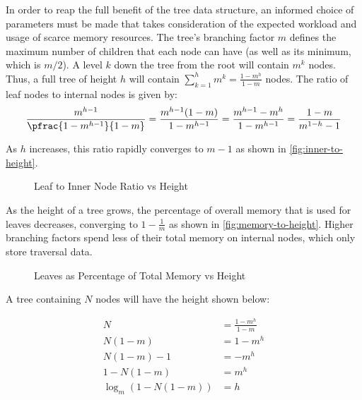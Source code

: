 \label{subsec:system-architecture}

\label{subsec:tree-parameters}


In order to reap the full benefit of the tree data structure, an informed choice
of parameters must be made that takes consideration of the expected workload and
usage of scarce memory resources.
%
The tree's branching factor $m$ defines the maximum number of children that each
node can have (as well as its minimum, which is $m/2$). A level $k$ down the
tree from the root will contain $m^k$ nodes. Thus, a full tree of height $h$
will contain $\sum_{k=1}^h m^k = \frac{1-m^h}{1-m}$ nodes.
%
The ratio of leaf nodes to internal nodes is given by:
$$
	\frac{m^{h-1}}{\pfrac{1-m^{h-1}}{1-m}}
	= \frac{m^{h-1}(1-m)}{1-m^{h-1}}
	= \frac{m^{h-1}-m^{h}}{1-m^{h-1}}
	= \frac{1-m}{m^{1-h} - 1}
$$

As $h$ increases, this ratio rapidly converges to $m-1$ as shown in
\autoref{fig:inner-to-height}.

\begin{figure}[H]
	\centering
	
	\caption{Leaf to Inner Node Ratio vs Height}
	\label{fig:inner-to-height}
\end{figure}

As the height of a tree grows, the percentage of overall memory that is used for
leaves decreases, converging to $1-\frac{1}{m}$ as shown in
\autoref{fig:memory-to-height}. Higher branching factors spend less of their
total memory on internal nodes, which only store traversal data.

\begin{figure}[H]
	\centering
	
	\caption{Leaves as Percentage of Total Memory vs Height}
	\label{fig:memory-to-height}
\end{figure}

A tree containing $N$ nodes will have the height shown below:

\begin{align*}
	N &= \frac{1-m^h}{1-m} \\
	N (1-m) &= 1-m^h \\
	N (1-m) - 1 &= -m^h \\
	1 - N (1-m) &= m^h \\
	\log_m\left(1 - N (1-m)\right) &= h
\end{align*}

